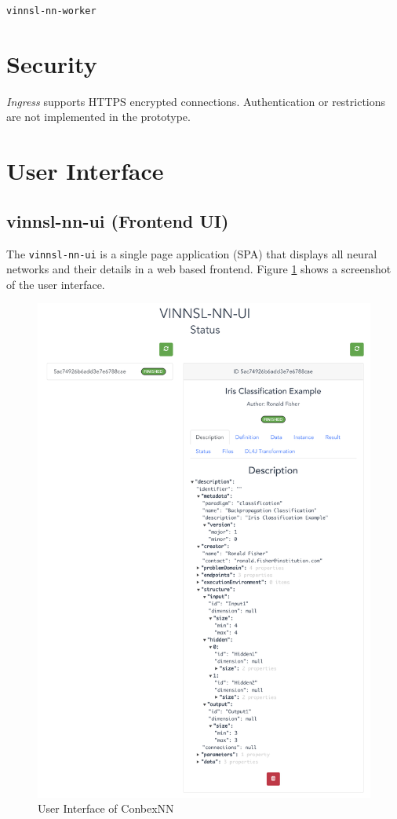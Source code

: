 \texttt{vinnsl-nn-worker}

\section{Security}\label{security}

\emph{Ingress} supports HTTPS encrypted connections. Authentication or
restrictions are not implemented in the prototype.

\section{User Interface}\label{user-interface-1}

\subsection{vinnsl-nn-ui (Frontend UI)}\label{vinnsl-nn-ui-frontend-ui}

The \texttt{vinnsl-nn-ui} is a single page application (SPA) that
displays all neural networks and their details in a web based frontend.
Figure \ref{img.vinnsl-nn-ui} shows a screenshot of the user interface.

\begin{figure}
\centering
\includegraphics[width=15.00000cm]{images/VINNSL-NN-UI}
\caption{User Interface of ConbexNN \label{img.vinnsl-nn-ui}}
\end{figure}

